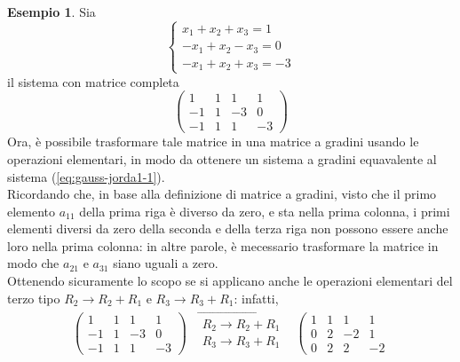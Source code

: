 \documentclass{book}
\theoremstyle{definition}
\newtheorem{es}{Esempio}[section]
\theoremstyle{plain}
\begin{document}
\begin{es}
  \label{es:gauss-jorda1}
  Sia
  \begin{equation}
    \label{eq:gauss-jorda1-1}
    \begin{cases}
      x_1+x_2+x_3=1\\
      -x_1+x_2-x_3=0\\
      -x_1+x_2+x_3=-3
    \end{cases}
  \end{equation}
  il sistema con matrice completa
  \begin{equation}
    \label{eq:gauss-jorda1-2}
    \left(
      \begin{array}{ccc|c}
        1 & 1 & 1 & 1\\
        -1 & 1 & -3 & 0\\
        -1 & 1 & 1 & -3
      \end{array}\right)
  \end{equation}
  Ora, è possibile trasformare tale matrice in una matrice a gradini
  usando le operazioni elementari, in modo da ottenere un sistema a
  gradini equavalente al sistema (\ref{eq:gauss-jorda1-1}).\\ Ricordando
  che, in base alla definizione di matrice a gradini, visto che il primo
  elemento $a_{11}$ della prima riga è diverso da zero, e sta nella prima
  colonna, i primi elementi diversi da zero della seconda e della terza
  riga non possono essere anche loro nella prima colonna: in altre parole,
  è mecessario trasformare la matrice in modo che $a_{21}$ e $a_{31}$
  siano uguali a zero.\\
  Ottenendo sicuramente lo scopo se si applicano anche le operazioni
  elementari del terzo tipo $R_2\to R_2+R_1$ e $R_3\to R_3+R_1$: infatti,
  \begin{eqnarray*}
    \left(
      \begin{array}{ccc|c}
        1 & 1 & 1 & 1\\
        -1 & 1 & -3 & 0\\
        -1 & 1 & 1 & -3
      \end{array}\right)& \overrightarrow{
        \begin{matrix}
          R_2\to R_2+R_1\\
          R_3\to R_3+R_1
        \end{matrix}
      }& \left(
        \begin{array}{ccc|c}
          1 & 1 & 1 & 1\\
          0 & 2 & -2 & 1\\
          0 & 2 & 2 & -2

\end{array}
\end{eqnarray*}
\end{es}
\end{document}
